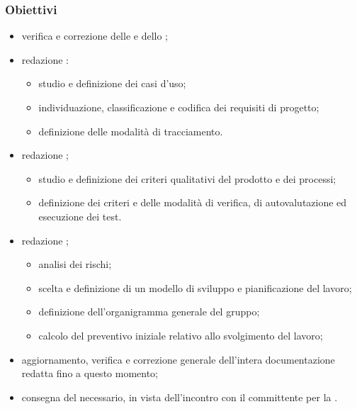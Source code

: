         \subsubsection{Obiettivi}
            \begin{itemize}
                \item verifica e correzione delle \NdP{} e dello \SdF{};
                \item redazione \AdR{}:
                \begin{itemize}
                    \item studio e definizione dei casi d'uso;
                    \item individuazione, classificazione e codifica dei requisiti di progetto;
                    \item definizione delle modalità di tracciamento.
                \end{itemize}
                \item redazione \PdQ{};
                \begin{itemize}
                    \item studio e definizione dei criteri qualitativi del prodotto e dei processi;
                    \item definizione dei criteri e delle modalità di verifica, di autovalutazione ed esecuzione dei test.
                \end{itemize}
                \item redazione \PdP{};
                \begin{itemize}
                    \item analisi dei rischi;
                    \item scelta e definizione di un modello di sviluppo e pianificazione del lavoro;
                    \item definizione dell'organigramma generale del gruppo;
                    \item calcolo del preventivo iniziale relativo allo svolgimento del lavoro;
                \end{itemize}
                \item aggiornamento, verifica e correzione generale dell'intera documentazione redatta fino a questo momento;
                \item consegna del  necessario, in vista dell'incontro con il committente per la \RR{}.
            \end{itemize}